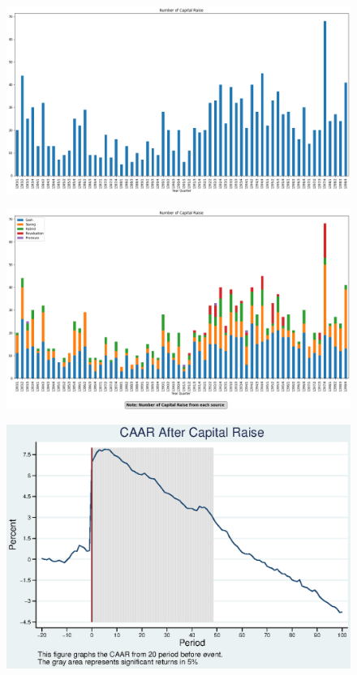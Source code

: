 \documentclass[12pt]{article}
\begin{document}
\begin{landscape}
\begin{figure}
\centering
\includegraphics[width=1\linewidth]{Q2Number}
\caption{}
\label{fig:q2number}
\end{figure}
\end{landscape}
\begin{landscape}
\begin{figure}
\centering
\includegraphics[width=1\linewidth]{Q2Number2}
\caption{}
\label{fig:q2number2}
\end{figure}
\end{landscape}





\begin{figure}
\centering
\includegraphics[width=0.7\linewidth]{AbReturn.eps}
\caption{}
\label{fig:abreturn}
\end{figure}
\end{document}
